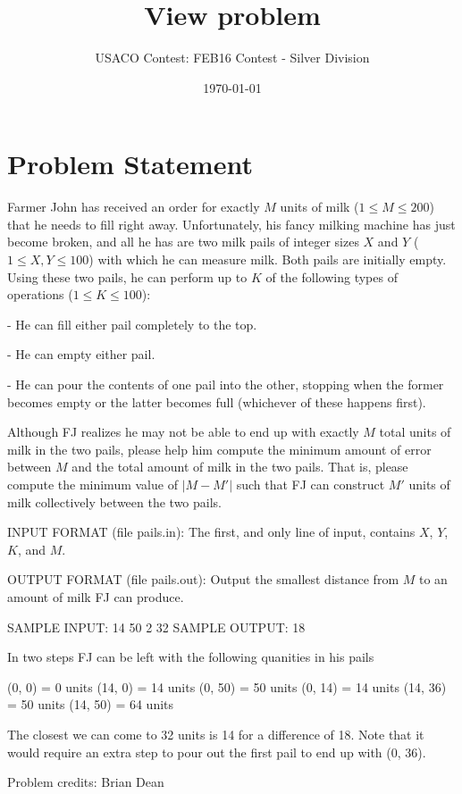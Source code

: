 \documentclass[12pt]{article}
\title{View problem}
\author{USACO Contest: FEB16 Contest - Silver Division}
\date{\today}
\begin{document}
\maketitle

\section*{Problem Statement}

Farmer John has received an order for exactly $M$ units of milk
($1 \leq M \leq 200$) that he needs to fill right away.  Unfortunately, his
fancy milking machine has just become broken, and all he has are two milk pails
of integer sizes $X$ and $Y$ ($1 \leq X, Y \leq 100$) with which he can measure
milk.  Both pails are initially empty.  Using these two pails, he can perform up
to $K$ of the following types of operations ($1 \leq K \leq 100$):

- He can fill either pail completely to the top. 

- He can empty either pail. 

- He can pour the contents of one pail into the other, stopping when the former
becomes empty or the latter becomes full (whichever of these happens first).

Although FJ realizes he may not be able to end up with exactly $M$ total units
of milk in the two pails, please help him compute the minimum amount of error
between $M$ and the total amount of milk in the two pails.  That is, please
compute the minimum value of $|M-M'|$ such that FJ can construct $M'$ units of
milk collectively between the two  pails.

INPUT FORMAT (file pails.in):
The first, and only line of input, contains $X$, $Y$, $K$, and $M$.

OUTPUT FORMAT (file pails.out):
Output the smallest distance from $M$ to an amount of milk FJ can produce.

SAMPLE INPUT:
14 50 2 32
SAMPLE OUTPUT: 
18

In two steps FJ can be left with the following quanities in his pails


(0, 0) = 0 units
(14, 0) = 14 units
(0, 50) = 50 units
(0, 14) = 14 units
(14, 36) = 50 units
(14, 50) = 64 units

The closest we can come to 32 units is 14 for a difference of 18.  Note that it
would require an extra step to pour out the first pail to end up with (0, 36).

Problem credits: Brian Dean
\end{document}
